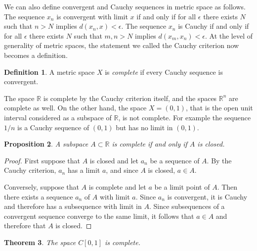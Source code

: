 \documentclass[11pt,oneside]{amsbook}
\newcommand{\R}{\mathbb R}
\theoremstyle{definition}
\theoremstyle{plain}
\newtheorem{theorem}{Theorem}[section]
\newtheorem{proposition}[theorem]{Proposition}
\theoremstyle{definition}
\newtheorem{definition}[theorem]{Definition}
\theoremstyle{remark}
\numberwithin{equation}{section}
\numberwithin{figure}{section}
\begin{document}

We can also define convergent and Cauchy sequences in metric space as follows. The sequence $x_n$ is convergent with limit $x$ if and only if for all $\epsilon$ there exists $N$ such that $n>N$ implies $d(x_n,x)<\epsilon$. The sequence $x_n$ is Cauchy if and only if for all $\epsilon$ there exists $N$ such that $m,n>N$ implies $d(x_m,x_n)<\epsilon$. At the level of generality of metric spaces, the statement we called the Cauchy criterion now becomes a definition.

\begin{definition}
  A metric space $X$ is \emph{complete} if every Cauchy sequence is convergent.
\end{definition}

The space $\R$ is complete by the Cauchy criterion itself, and the spaces $\R^n$ are complete as well. On the other hand, the space $X=(0,1)$, that is the open unit interval considered as a subspace of $\R$, is not complete. For example the sequence $1/n$ is a Cauchy sequence of $(0,1)$ but has no limit in $(0,1)$.

\begin{proposition}
  A subspace $A\subset\R$ is complete if and only if $A$ is closed.
\end{proposition}

\begin{proof}
  First suppose that $A$ is closed and let $a_n$ be a sequence of $A$. By the Cauchy criterion, $a_n$ has a limit $a$, and since $A$ is closed, $a\in A$. 

  Conversely, suppose that $A$ is complete and let $a$ be a limit point of $A$. Then there exists a sequence $a_n$ of $A$ with limit $a$. Since $a_n$ is convergent, it is Cauchy and therefore has a subsequence with limit in $A$. Since subsequences of a convergent sequence converge to the same limit, it follows that $a\in A$ and therefore that $A$ is closed.
\end{proof}

\begin{theorem}
  The space $C[0,1]$ is complete.
\end{theorem}
\end{document}

